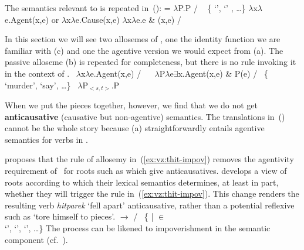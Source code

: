 \xe

The semantics relevant to {\va} is repeated in~(\nextx):
\pex {} = 
	\a $\lambda$P.P \phantom{agent(x,e)xxx} / \trace~ \{  `',  `' , \dots \}
	\a $\lambda$x$\lambda$e.Agent(x,e) or $\lambda$x$\lambda$e.Cause(x,e)
	\a $\lambda$x$\lambda$e.e \& (x,e) / \trace~\va
\xe

In this section we will see two allosemes of {\vz}, one the identity function we are familiar with (\nextx c) and one the agentive version we would expect from {\va} (\nextx a). The passive alloseme (\nextx b) is repeated for completeness, but there is no rule invoking it in the context of {\va}.
\pex \label{ex:vz-denote}
	\a \denote{\vz} \lra~$\lambda$x$\lambda$e.Agent(x,e) / \trace~\va
	\a \denote{\vz} \lra~$\lambda$P$\lambda$e$\exists$x.Agent(x,e) \& P(e) / \trace~\{ `murder',  `say’, \dots\}
	\a \denote{\vz} \lra~$\lambda$P$_{<s,t>}$.P
\xe

When we put the pieces together, however, we find that we do not get \textbf{anticausative} (causative but non-agentive) semantics. The translations in~(\lastx) cannot be the whole story because (\lastx a) straightforwardly entails agentive semantics for verbs in {\thit}.

\cite{kastner17gjgl} proposes that the rule of allosemy in~(\ref{ex:vz:thit-impov}) removes the agentivity requirement of {\va}~for roots such as  which give anticausatives. \cite{kastner16phd,kastner17gjgl} develops a view of roots according to which their lexical semantics determines, at least in part, whether they will trigger the rule in~(\ref{ex:vz:thit-impov}). This change renders the resulting verb \emph{hitparek} `fell apart' anticausative, rather than a potential reflexive such as `tore himself to pieces'.
\ex\label{ex:vz:thit-impov}\denote{\va~\!} $\rightarrow$ {\zero} / {\vz} \trace~\{ | 
  $\in$ 
 \\ \phantom{a} \hfill 
	 `',  `',  `', \dots\}
\xe
The process can be likened to impoverishment \citep{bonet91,noyer98} in the semantic component (cf.~\citealt{nevins15roots}).

